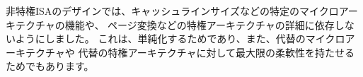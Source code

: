 \begin{comment}
The RISC-V ISA is defined avoiding implementation details as much as
possible (although commentary is included on implementation-driven
decisions) and should be read as the software-visible interface to a
wide variety of implementations rather than as the design of a
particular hardware artifact.  The RISC-V manual is structured in two
volumes.  This volume covers the design of the base {\em unprivileged}
instructions, including optional unprivileged ISA extensions.
Unprivileged instructions are those that are generally usable in all
privilege modes in all privileged architectures, though behavior might
vary depending on privilege mode and privilege architecture.  The
second volume provides the design of the first (``classic'')
privileged architecture. The manuals use IEC 80000-13:2008
conventions, with a byte of 8 bits.
\end{comment}

\begin{comment}
\begin{commentary}
In the unprivileged ISA design, we tried to remove any dependence on
particular microarchitectural features, such as cache line size, or on
privileged architecture details, such as page translation.  This is
both for simplicity and to allow maximum flexibility for alternative
microarchitectures or alternative privileged architectures.
\end{commentary}
\end{comment}

非特権ISAのデザインでは、キャッシュラインサイズなどの特定のマイクロアーキテクチャの機能や、
ページ変換などの特権アーキテクチャの詳細に依存しないようにしました。 
これは、単純化するためであり、また、代替のマイクロアーキテクチャや
代替の特権アーキテクチャに対して最大限の柔軟性を持たせるためでもあります。

